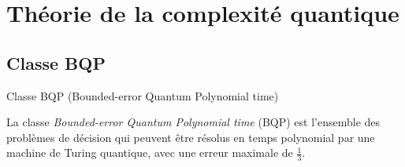 \documentclass[aspectratio=169]{beamer}
\theoremstyle{plain}
\theoremstyle{definition}
\DeclarePairedDelimiter\ket{\lvert}{\rangle}
\begin{document}
\section{Théorie de la complexité quantique}
\subsection{Classe BQP}
\begin{frame}{Classe BQP (Bounded-error Quantum Polynomial time)}
    \begin{definition}[BQP] 
        La classe \emph{Bounded-error Quantum Polynomial time} (BQP) est l'ensemble des problèmes de décision qui peuvent être résolus en temps polynomial par une machine de Turing quantique, avec une erreur maximale de $\frac{1}{3}$. 
    \end{definition}
\end{frame}

%
\end{document}
